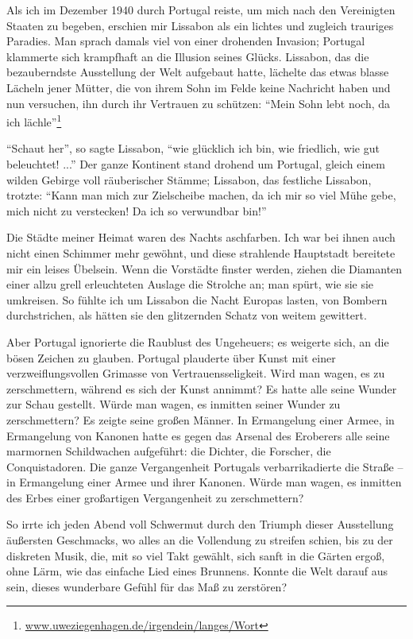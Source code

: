 \documentclass[12pt,ngerman,parskip=half]{scrartcl}
\begin{document}
Als ich im Dezember 1940 durch Portugal reiste, um mich nach den Vereinigten Staaten zu begeben, erschien mir Lissabon als ein lichtes und zugleich trauriges Paradies. Man sprach damals viel von einer drohenden Invasion; Portugal klammerte sich krampfhaft an die Illusion seines Glücks. Lissabon, das die bezauberndste Ausstellung der Welt aufgebaut hatte, lächelte das etwas blasse Lächeln jener Mütter, die von ihrem Sohn im Felde keine Nachricht haben und nun versuchen, ihn durch ihr Vertrauen zu schützen: \enquote{Mein Sohn lebt noch, da ich lächle}\footnote{\url{www.uweziegenhagen.de/irgendein/langes/Wort}}

\enquote{Schaut her}, so sagte Lissabon, \enquote{wie glücklich ich bin, wie friedlich, wie gut beleuchtet! ...} Der ganze Kontinent stand drohend um Portugal, gleich einem wilden Gebirge voll räuberischer Stämme; Lissabon, das festliche Lissabon, trotzte: \enquote{Kann man mich zur Zielscheibe machen, da ich mir so viel Mühe gebe, mich nicht zu verstecken! Da ich so verwundbar bin!}

Die Städte meiner Heimat waren des Nachts aschfarben. Ich war bei ihnen auch nicht einen Schimmer mehr gewöhnt, und diese strahlende Hauptstadt bereitete mir ein leises Übelsein. Wenn die Vorstädte finster werden, ziehen die Diamanten einer allzu grell erleuchteten Auslage die Strolche an; man spürt, wie sie sie umkreisen. So fühlte ich um Lissabon die Nacht Europas lasten, von Bombern durchstrichen, als hätten sie den glitzernden Schatz von weitem gewittert.

Aber Portugal ignorierte die Raublust des Ungeheuers; es weigerte sich, an die bösen Zeichen zu glauben. Portugal plauderte über Kunst mit einer verzweiflungsvollen Grimasse von Vertrauensseligkeit. Wird man wagen, es zu zerschmettern, während es sich der Kunst annimmt? Es hatte alle seine Wunder zur Schau gestellt. Würde man wagen, es inmitten seiner Wunder zu zerschmettern? Es zeigte seine großen Männer. In Ermangelung einer Armee, in Ermangelung von Kanonen hatte es gegen das Arsenal des Eroberers alle seine marmornen Schildwachen aufgeführt: die Dichter, die Forscher, die Conquistadoren. Die ganze Vergangenheit Portugals verbarrikadierte die Straße -- in Ermangelung einer Armee und ihrer Kanonen. Würde man wagen, es inmitten des Erbes einer großartigen Vergangenheit zu zerschmettern?

So irrte ich jeden Abend voll Schwermut durch den Triumph dieser Ausstellung äußersten Geschmacks, wo alles an die Vollendung zu streifen schien, bis zu der diskreten Musik, die, mit so viel Takt gewählt, sich sanft in die Gärten ergoß, ohne Lärm, wie das einfache Lied eines Brunnens. Konnte die Welt darauf aus sein, dieses wunderbare Gefühl für das Maß zu zerstören?
\end{document}
